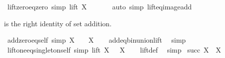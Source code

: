 \begin{isabellebody}
\isanewline
%
\endisadelimproof
\isanewline
{}\isamarkupfalse%
\ lift{\isacharunderscore}{\kern0pt}zero{\isacharunderscore}{\kern0pt}eq{\isacharunderscore}{\kern0pt}zero\ {\isacharbrackleft}{\kern0pt}simp{\isacharbrackright}{\kern0pt}{\isacharcolon}{\kern0pt}\ {\isachardoublequoteopen}lift\ X\ {}\ {\isacharequal}{\kern0pt}\ {}{\isachardoublequoteclose}\isanewline
%
\isadelimproof
\ \ %
\endisadelimproof
%
\isatagproof
{}\isamarkupfalse%
\ {\isacharparenleft}{\kern0pt}auto\ simp{\isacharcolon}{\kern0pt}\ lift{\isacharunderscore}{\kern0pt}eq{\isacharunderscore}{\kern0pt}image{\isacharunderscore}{\kern0pt}add{\isacharparenright}{\kern0pt}%
\endisatagproof
{\isafoldproof}%
%
\isadelimproof
%
\endisadelimproof
%
\begin{isamarkuptext}%
 is the right identity of set addition.%
\end{isamarkuptext}\isamarkuptrue%
\isamarkupfalse%
\ add{\isacharunderscore}{\kern0pt}zero{\isacharunderscore}{\kern0pt}eq{\isacharunderscore}{\kern0pt}self\ {\isacharbrackleft}{\kern0pt}simp{\isacharbrackright}{\kern0pt}{\isacharcolon}{\kern0pt}\ {\isachardoublequoteopen}X\ {\isacharplus}{\kern0pt}\ {}\ {\isacharequal}{\kern0pt}\ X{\isachardoublequoteclose}\isanewline
%
\isadelimproof
\ \ %
\endisadelimproof
%
\isatagproof
{}\isamarkupfalse%
\ add{\isacharunderscore}{\kern0pt}eq{\isacharunderscore}{\kern0pt}bin{\isacharunderscore}{\kern0pt}union{\isacharunderscore}{\kern0pt}lift\ \isamarkupfalse%
\ simp%
\endisatagproof
{\isafoldproof}%
%
\isadelimproof
\isanewline
%
\endisadelimproof
\isanewline
{}\isamarkupfalse%
\ lift{\isacharunderscore}{\kern0pt}one{\isacharunderscore}{\kern0pt}eq{\isacharunderscore}{\kern0pt}singleton{\isacharunderscore}{\kern0pt}self\ {\isacharbrackleft}{\kern0pt}simp{\isacharbrackright}{\kern0pt}{\isacharcolon}{\kern0pt}\ {\isachardoublequoteopen}lift\ X\ {}\ {\isacharequal}{\kern0pt}\ {\isacharbraceleft}{\kern0pt}X{\isacharbraceright}{\kern0pt}{\isachardoublequoteclose}\isanewline
%
\isadelimproof
\ \ %
\endisadelimproof
%
\isatagproof
{}\isamarkupfalse%
\ lift{\isacharunderscore}{\kern0pt}def\ \isamarkupfalse%
\ simp%
\endisatagproof
{\isafoldproof}%
%
\isadelimproof
\isanewline
%
\endisadelimproof
\isanewline
{}\isamarkupfalse%
\ {\isachardoublequoteopen}succ\ X\ {\isasymequiv}\ X\ {\isacharplus}{\kern0pt}\ {}{\isachardoublequoteclose}\isanewline
\isanewline

\end{isabellebody}
